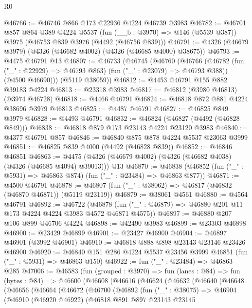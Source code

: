 \begin{lexlean}{R0}
\begin{coremodule}
@46766 := @46746 @866 @173 @22936 @4224 @46739 @3983
@46782 := @46701
    @857
    @864
    @389
    @4224
    @5537
    (fun (__b : @3970) => @146 (@5539 @387))
    @3975
    (@46753 @839 @3976 (@4492 (@46756 @839)))
@46791 := @4326 (@46679 @3979) (@4326 (@46682 @4002) (@4326 (@46685 @4000) @38675))
@46793 := @4475 @46791 @13
@46807 := @46733
    (@46745
      (@46760
        (@46766
          (@46782 (fun ("_" : @22929) => @46793 @863) (fun ("_" : @23079) => @46793 @388))
          (@4500 @46690)))
      (@5119 @38059))
@46812 := @4453 @46791 @155 @882 @39183 @4224
@46813 := @23318 @3983
@46817 := @46812 (@3980 @46813) (@3974 @46728)
@46818 := @4466 @46791
@46824 := @46818 @872 @881 @4224 @38696 @3979 @46813
@46825 := @4487 @46791
@46827 := @46825 @849 @3979
@46828 := @4493 @46791
@46832 := @46824 (@46827 (@4492 (@46828 @849)))
@46838 := @46818 @879 @173 @23143 @4224 @23120 @3983
@46840 := @4377 @46791 @857
@46846 := @46840 @875 @878 @4224 @5537 @23063 @3999
@46851 := @46825 @839 @4000 (@4492 (@46828 @839))
@46852 := @46846 @46851
@46863 := @4475 (@4326 (@46679 @4002) (@4326 (@46682 @4038) (@4326 (@46685 @4094) @39013))) @13
@46870 := @46838 (@46852 (fun ("_" : @5931) => @46863 @874) (fun ("_" : @23484) => @46863 @877))
@46871 := @4500 @46791
@46878 := @46807 (fun ("_" : @38062) => @46817 (@46832 (@46870 @46871)) (@5119 @23119))
@46879 := @38061 @4561
@46880 := @4564 @46791
@46892 := @46722
    (@46878 (fun ("_" : @46879) => @46880 @201 @11 @173 @4224 @4224 @3983 @4572 @46871 @4575))
@46897 := @46880 @207 @106 @899 @46706 @4224
@46898 := @42490 @3983
@46899 := @23303 @46898
@46900 := @23429 @46899
@46901 := @23427 @46900
@46904 := @46897 @46901 (@3992 @46901)
@46910 := @46818 @888 @898 @23143 @23146 @23426 @46900
@46920 := @46840 @151 @286 @4224 @5537 @23456 @3999 @46851 (fun ("_" : @5931) => @46863 @150)
@46922 := fun ("_" : @23484) => @46863 @285
@47006 := @46583
    (fun (grouped : @3970) =>
    fun (lanes : @84) =>
    fun (bytes : @84) =>
    @46600
      (@46608
        (@46616
          (@46624
            (@46632
              (@46640
                (@46648
                  (@46656
                    (@46664
                      (@46672
                        (@46700
                          (@46892
                            (fun ("_" : @38075) =>
                            @46904
                              (@46910
                                (@46920 @46922)
                                (@46818
                                  @891
                                  @897
                                  @23143
                                  @23145

\end{coremodule}
\end{lexlean}
